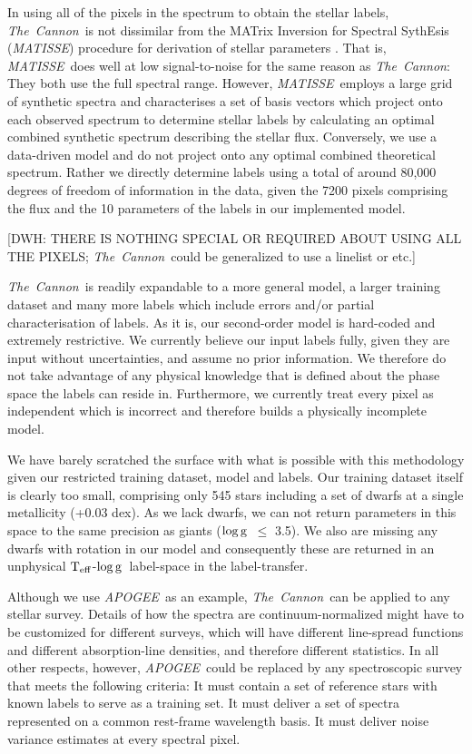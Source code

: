 \documentclass[12pt, preprint]{aastex}
\newcommand{\teff}{\mbox{$\rm T_{eff}$}}
\newcommand{\logg}{\mbox{$\rm \log g$}}
\newcommand{\tc}{\textsl{The~Cannon}}
\newcommand{\apogee}{\textsl{APOGEE}}
\newcommand{\matisse}{\textsl{MATISSE}}
\begin{document}
In using all of the pixels in the spectrum to obtain the
stellar labels, \tc\ is not dissimilar from the MATrix Inversion for
Spectral SythEsis (\matisse) procedure for derivation of stellar
parameters \citep{RB2006}.
That is, \matisse\ does well at low signal-to-noise for the same
reason as \tc:  They both use the full spectral range.
However, \matisse\ employs a large grid of synthetic spectra and
characterises a set of basis vectors which project onto each observed
spectrum to determine stellar labels by calculating an optimal
combined synthetic spectrum describing the stellar flux.
Conversely, we use a data-driven model and do not project onto any
optimal combined theoretical spectrum.
Rather we directly determine labels using a total of around 80,000
degrees of freedom of information in the data, given the 7200 pixels
comprising the flux and the 10 parameters of the labels in our
implemented model.

[DWH: THERE IS NOTHING SPECIAL OR REQUIRED ABOUT USING ALL THE PIXELS; \tc\ could be generalized to use a linelist or etc.]

 \tc\ is readily expandable to a more general model, a larger training dataset and many more labels which include errors and/or partial characterisation of labels. 
 As it is, our second-order model is hard-coded and extremely restrictive. 
 We currently believe our input labels fully, given they are input without uncertainties, and assume no prior information. 
 We therefore do not take advantage of any physical knowledge that is defined about the phase space the labels can reside in.  
 Furthermore, we currently treat every pixel as independent which is incorrect and therefore builds a physically incomplete model.

 We have barely scratched the surface with what is possible with this methodology given our restricted training dataset, model and labels. 
 Our training dataset itself is clearly too small, comprising only 545 stars including a set of dwarfs at a single metallicity (+0.03 dex). 
 As we lack dwarfs, we can not return parameters in this space to the same precision as giants (\logg\ $\le$ 3.5).  
 We also are missing any dwarfs with rotation in our model and consequently these are returned in an unphysical \teff-\logg\ label-space in the label-transfer. 
 
Although we use \apogee\ as an example, \tc\ can be applied to
any stellar survey.
Details of how the spectra are continuum-normalized might have to be
customized for different surveys, which will have different
line-spread functions and different absorption-line densities, and
therefore different statistics.
In all other respects, however, \apogee\ could be replaced by any spectroscopic
survey that meets the following criteria:
It must contain a set of reference stars with known labels to serve as
a training set.
It must deliver a set of spectra represented on a common rest-frame
wavelength basis.
It must deliver noise variance estimates at every spectral pixel.
\end{document}
